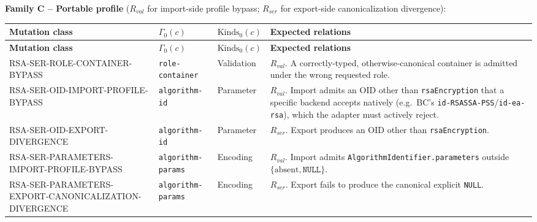 \documentclass[11pt,a4paper]{article}
\begin{document}
\textbf{Family C -- Portable profile} ($R_{val}$ for import-side profile bypass; $R_{ser}$ for export-side canonicalization divergence):
\begin{longtable}{p{}p{}p{}p{}}
\toprule
\textbf{Mutation class} & \textbf{$\Gamma_0(c)$} & \textbf{$\text{Kinds}_0(c)$} & \textbf{Expected relations}\\
\midrule\endfirsthead
\toprule
\textbf{Mutation class} & \textbf{$\Gamma_0(c)$} & \textbf{$\text{Kinds}_0(c)$} & \textbf{Expected relations}\\
\midrule\endhead
RSA-SER-ROLE-CONTAINER-BYPASS & \texttt{role-container} & Validation & $R_{val}$. A correctly-typed, otherwise-canonical container is admitted under the wrong requested role.\\
RSA-SER-OID-IMPORT-PROFILE-BYPASS & \texttt{algorithm-id} & Parameter & $R_{val}$. Import admits an OID other than \texttt{rsaEncryption} that a specific backend accepts natively (e.g.\ BC's \texttt{id-RSASSA-PSS}/\texttt{id-ea-rsa}), which the adapter must actively reject.\\
RSA-SER-OID-EXPORT-DIVERGENCE & \texttt{algorithm-id} & Parameter & $R_{ser}$. Export produces an OID other than \texttt{rsaEncryption}.\\
RSA-SER-PARAMETERS-IMPORT-PROFILE-BYPASS & \texttt{algorithm-params} & Encoding & $R_{val}$. Import admits \texttt{AlgorithmIdentifier.parameters} outside $\{\text{absent},\texttt{NULL}\}$.\\
RSA-SER-PARAMETERS-EXPORT-CANONICALIZATION-DIVERGENCE & \texttt{algorithm-params} & Encoding & $R_{ser}$. Export fails to produce the canonical explicit \texttt{NULL}.\\
\end{longtable}
\end{document}
